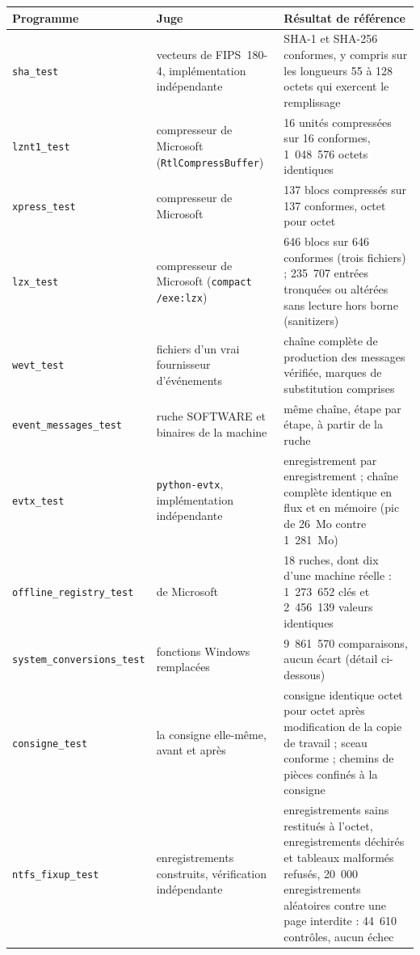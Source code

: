 \documentclass[11pt,a4paper,oneside]{report}
\begin{document}
\begin{longtable}{@{}L{4.6cm}L{3.8cm}L{6.6cm}@{}}
\toprule
\textbf{Programme} & \textbf{Juge} & \textbf{Résultat de référence} \\
\midrule
\endhead
\texttt{sha\_test} & vecteurs de FIPS~180-4, implémentation indépendante &
  SHA-1 et SHA-256 conformes, y compris sur les longueurs 55 à 128 octets qui
  exercent le remplissage \\
\texttt{lznt1\_test} & compresseur de Microsoft (\texttt{RtlCompressBuffer}) &
  16 unités compressées sur 16 conformes, 1~048~576 octets identiques \\
\texttt{xpress\_test} & compresseur de Microsoft &
  137 blocs compressés sur 137 conformes, octet pour octet \\
\texttt{lzx\_test} & compresseur de Microsoft (\texttt{compact /exe:lzx}) &
  646 blocs sur 646 conformes (trois fichiers) ; 235~707 entrées tronquées ou
  altérées sans lecture hors borne (sanitizers) \\
\texttt{wevt\_test} & fichiers d'un vrai fournisseur d'événements &
  chaîne complète de production des messages vérifiée, marques de substitution
  comprises \\
\texttt{event\_messages\_test} & ruche SOFTWARE et binaires de la machine &
  même chaîne, étape par étape, à partir de la ruche \\
\texttt{evtx\_test} & \texttt{python-evtx}, implémentation indépendante &
  enregistrement par enregistrement ; chaîne complète identique en flux et en
  mémoire (pic de 26~Mo contre 1~281~Mo) \\
\texttt{offline\_registry\_test} &  de Microsoft &
  18 ruches, dont dix d'une machine réelle : 1~273~652 clés et 2~456~139
  valeurs identiques \\
\texttt{system\_conversions\_test} & fonctions Windows remplacées &
  9~861~570 comparaisons, aucun écart (détail ci-dessous) \\
\texttt{consigne\_test} & la consigne elle-même, avant et après &
  consigne identique octet pour octet après modification de la copie de
  travail ; sceau conforme ; chemins de pièces confinés à la consigne \\
\texttt{ntfs\_fixup\_test} & enregistrements construits, vérification indépendante &
  enregistrements sains restitués à l'octet, enregistrements déchirés et
  tableaux malformés refusés, 20~000 enregistrements aléatoires contre une page
  interdite : 44~610 contrôles, aucun échec \\

\end{longtable}
\end{document}
